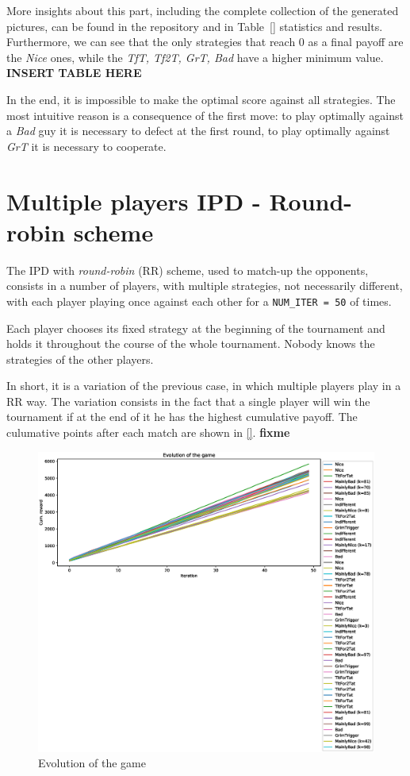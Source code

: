 \documentclass[journal,a4paper,10pt,twoside]{IEEEtran} %
\begin{document}
More insights about this part, including the complete collection of the generated pictures, can be found in the repository and in Table~\ref{} statistics and results. Furthermore, we can see that the only strategies that reach $0$ as a final payoff are the \textit{Nice} ones, while the \textit{TfT, Tf2T, GrT, Bad} have a higher minimum value.
\textbf{INSERT TABLE HERE}

In the end, it is impossible to make the optimal score against all strategies. The most intuitive reason is a consequence of the first move: to play optimally against a \textit{Bad} guy it is necessary to defect at the first round, to play optimally against \textit{GrT} it is necessary to cooperate.~\cite{mathieu2017}

\section{Multiple players IPD - Round-robin scheme} \label{s:IPDMP}
The IPD with \textit{round-robin} (RR) scheme, used to match-up the opponents, consists in a number of players, with multiple strategies, not necessarily different, with each player playing once against each other for a \texttt{NUM\_ITER = 50} of times.

Each player chooses its fixed strategy at the beginning of the tournament and holds it throughout the course of the whole tournament. Nobody knows the strategies of the other players.

In short, it is a variation of the previous case, in which multiple players play in a RR way. The variation consists in the fact that a single player will win the tournament if at the end of it he has the highest cumulative payoff. The culumative points after each match are shown in \autoref{}. \textbf{fixme}

\begin{figure}[!ht]
    \centering
    \includegraphics[width=1\columnwidth]{../img/ipdmp/ipdmp-evolution-of-game-50}
    \caption{Evolution of the game}
    \label{fig:boxIPDMPevo}
\end{figure}
\end{document}

